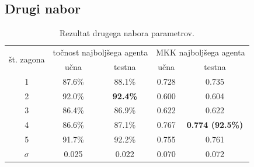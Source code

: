 \subsection{Drugi nabor}\label{subsec:dodatek-statlog-drugi-nabor}
\begin{table}[H]
    \begin{center}
        \begin{tabular}{|| c | c c || c c ||}
            \hline
            \multirow{2}{*}{št. zagona} & \multicolumn{2}{c||}{točnost najboljšega agenta} & \multicolumn{2}{c||}{MKK najboljšega agenta} \\ \cline{2-5}
            & učna   & testna          & učna  & testna                  \\
            \hline
            1        & 87.6\% & 88.1\%          & 0.728 & 0.735                   \\
            \hline
            2        & 92.0\% & \textbf{92.4\%} & 0.600 & 0.604                   \\
            \hline
            3        & 86.4\% & 86.9\%          & 0.622 & 0.622                   \\
            \hline
            4        & 86.6\% & 87.1\%          & 0.767 & \textbf{0.774 (92.5\%)} \\
            \hline
            5        & 91.7\% & 92.2\%          & 0.755 & 0.761                   \\
            \hline
            $\sigma$ & 0.025  & 0.022           & 0.070 & 0.072                   \\
            \hline
        \end{tabular}
    \end{center}
    \caption{Rezultat drugega nabora parametrov.}
    \label{tab:statlog_result_2}
\end{table}

